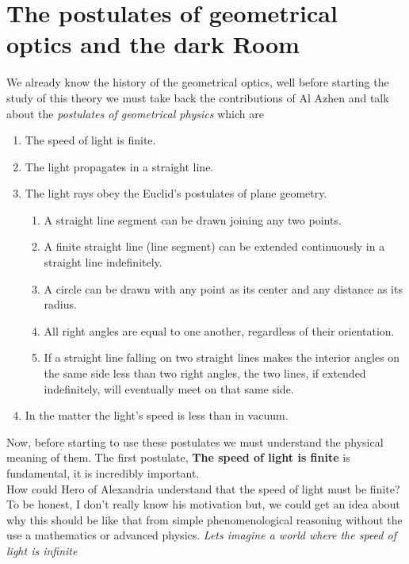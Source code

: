 \section{The postulates of geometrical optics and the dark Room}

        We already know the history of the geometrical optics, well before starting the study of this theory we must take back the contributions of Al Azhen and talk about the \emph{postulates of geometrical physics} which are
    
        \begin{enumerate}
            \item The speed of light is finite.
            \item The light propagates in a straight line.
            \item The light rays obey the Euclid's postulates of plane geometry.
            \begin{enumerate}
                \item A straight line segment can be drawn joining any two points.
                \item A finite straight line (line segment) can be extended continuously in a straight line indefinitely.
                \item A circle can be drawn with any point as its center and any distance as its radius.
                \item All right angles are equal to one another, regardless of their orientation.
                
                \item If a straight line falling on two straight lines makes the interior angles on the same side less than two right angles, the two lines, if extended indefinitely, will eventually meet on that same side.
            \end{enumerate}
            \item In the matter the light's speed is less than in vacuum.
        \end{enumerate}

        Now, before starting to use these postulates we must understand the physical meaning of them. The first postulate, \textbf{The speed of light is finite} is fundamental, it is incredibly important. \\

    How could Hero of Alexandria understand that the speed of light must be finite? To be honest, I don't really know his motivation but, we could get an idea about why this should be like that from simple phenomenological reasoning without the use a mathematics or advanced physics. \textit{Lets imagine a world where the speed of light is infinite}\\

